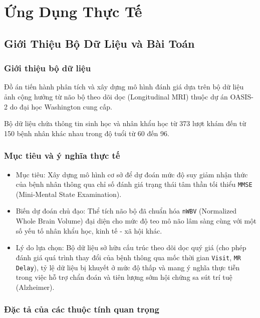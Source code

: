 \chapter{Ứng Dụng Thực Tế}

\newpage

\section{Giới Thiệu Bộ Dữ Liệu và Bài Toán}

\subsection{Giới thiệu bộ dữ liệu}

Đồ án tiến hành phân tích và xây dựng mô hình đánh giá dựa trên bộ dữ liệu ảnh cộng hưởng từ não bộ theo dõi dọc (Longitudinal MRI) thuộc dự án OASIS-2 do đại học Washington cung cấp.

Bộ dữ liệu chứa thông tin sinh học và nhân khẩu học từ 373 lượt khám đến từ 150 bệnh nhân khác nhau trong độ tuổi từ 60 đến 96.

\subsection{Mục tiêu và ý nghĩa thực tế}

\begin{itemize}[topsep=0pt, itemsep=2.5pt, leftmargin=1.5cm]
    \item Mục tiêu: Xây dựng mô hình cơ sở để dự đoán mức độ suy giảm nhận thức của bệnh nhân thông qua chỉ số đánh giá trạng thái tâm thần tối thiểu \texttt{MMSE} (Mini-Mental State Examination).
    \item Biến dự đoán chủ đạo: Thể tích não bộ đã chuẩn hóa \texttt{nWBV} (Normalized Whole Brain Volume) đại diện cho mức độ teo mô não lâm sàng cùng với một số yếu tố nhân khẩu học, kinh tế - xã hội khác.
    \item Lý do lựa chọn: Bộ dữ liệu sở hữu cấu trúc theo dõi dọc quý giá (cho phép đánh giá quá trình thay đổi của bệnh thông qua mốc thời gian \texttt{Visit}, \texttt{MR Delay}), tỷ lệ dữ liệu bị khuyết ở mức độ thấp và mang ý nghĩa thực tiễn trong việc hỗ trợ chẩn đoán và tiên lượng sớm hội chứng sa sút trí tuệ (Alzheimer).
\end{itemize}

\subsection{Đặc tả của các thuộc tính quan trọng}


